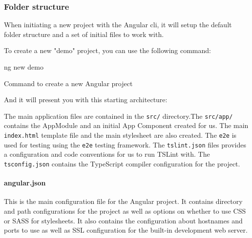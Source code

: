 \documentclass[twoside, openright,11pt,a4paper]{book}
\newenvironment{code}{\captionsetup{type=listing}}{}
\begin{document}
\subsubsection{Folder structure}
When initiating a new project with the Angular \gls{cli}, it will setup the default folder structure and a set of initial files to work with.

To create a new "demo" project, you can use the following command:
\begin{code}
	\begin{shell}
ng new demo
	\end{shell}
	\caption{Command to create a new Angular project}
\end{code}
\newpage
And it will present you with this starting architecture:

The main application files are contained in the \verb+src/+ directory.The \verb+src/app/+ contains the AppModule and an initial App Component created for us. The main \verb+index.html+ template file and the main stylesheet are also created. The \verb+e2e+ is used for testing using the \verb+e2e+ testing framework. The \verb+tslint.json+ files provides a configuration and code conventions for us to run TSLint with. The \verb+tsconfig.json+ contains the TypeScript compiler configuration for the project.
\paragraph{angular.json}
This is the main configuration file for the Angular project. It contains directory and path configurations for the project as well as options on whether to use CSS or SASS for stylesheets. It also contains the configuration about hostnames and ports to use as well as SSL configuration for the built-in development web server.
\end{document}
